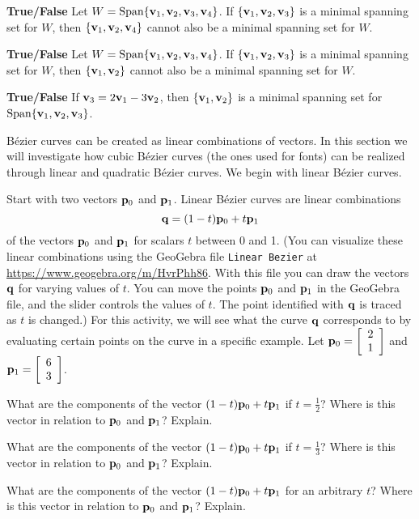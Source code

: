 \item \textbf{True/False} Let $W = \text{Span}\{\mathbf{v}_1, \mathbf{v}_2, \mathbf{v}_3, \mathbf{v}_4\}$. If $\{\mathbf{v}_1, \mathbf{v}_2, \mathbf{v}_3\}$ is a minimal spanning set for $W$, then $\{\mathbf{v}_1, \mathbf{v}_2, \mathbf{v}_4\}$ cannot also be a minimal spanning set for $W$.

\item \textbf{True/False} Let $W = \text{Span}\{\mathbf{v}_1, \mathbf{v}_2, \mathbf{v}_3, \mathbf{v}_4\}$. If $\{\mathbf{v}_1, \mathbf{v}_2, \mathbf{v}_3\}$ is a minimal spanning set for $W$, then $\{\mathbf{v}_1, \mathbf{v}_2\}$ cannot also be a minimal spanning set for $W$.

\item \textbf{True/False} If $\mathbf{v}_3=2\mathbf{v}_1-3\mathbf{v}_2$, then $\{\mathbf{v}_1, \mathbf{v}_2\}$ is a minimal spanning set for \\
$\text{Span}\{\mathbf{v}_1, \mathbf{v}_2, \mathbf{v}_3\}$.
\ea

\ee


B\'{e}zier curves can be created as linear combinations of vectors. In this section we will investigate how cubic B\'{e}zier curves (the ones used for fonts) can be realized through linear and quadratic B\'{e}zier curves. We begin with linear B\'{e}zier curves.

\begin{pactivity} \label{act:1_d_linear_Bezier} Start with two vectors $\mathbf{p}_0$ and $\mathbf{p}_1$. Linear B\'{e}zier curves are linear combinations 
\[\mathbf{q} = (1-t)\mathbf{p}_0 + t\mathbf{p}_1\]
of the vectors $\mathbf{p}_0$ and $\mathbf{p}_1$ for scalars $t$ between 0 and 1. (You can visualize these linear combinations using the GeoGebra file \texttt{Linear Bezier} at \url{https://www.geogebra.org/m/HvrPhh86}. With this file you can draw the vectors $\mathbf{q}$ for varying values of $t$. You can move the points $\mathbf{p}_0$ and $\mathbf{p}_1$ in the GeoGebra file, and the slider controls the values of $t$. The point identified with $\mathbf{q}$ is traced as $t$ is changed.)  For this activity, we will see what the curve $\mathbf{q}$ corresponds to by evaluating certain points on the curve in a specific example. Let $\mathbf{p}_0 = \left[ \begin{array}{c} 2 \\ 1 \end{array} \right]$ and $\mathbf{p}_1 = \left[ \begin{array}{c} 6 \\ 3 \end{array} \right]$. 
	\ba
	\item What are the components of the vector $(1-t)\mathbf{p}_0 + t\mathbf{p}_1$ if $t = \frac{1}{2}$? Where is this vector in relation to $\mathbf{p}_0$ and $\mathbf{p}_1$? Explain.


\item  What are the components of the vector $(1-t)\mathbf{p}_0 + t\mathbf{p}_1$ if $t = \frac{1}{3}$? Where is this vector in relation to $\mathbf{p}_0$ and $\mathbf{p}_1$? Explain.


\item What are the components of the vector $(1-t)\mathbf{p}_0 + t\mathbf{p}_1$ for an arbitrary $t$? Where is this vector in relation to $\mathbf{p}_0$ and $\mathbf{p}_1$? Explain. 


\ea

\end{pactivity}

